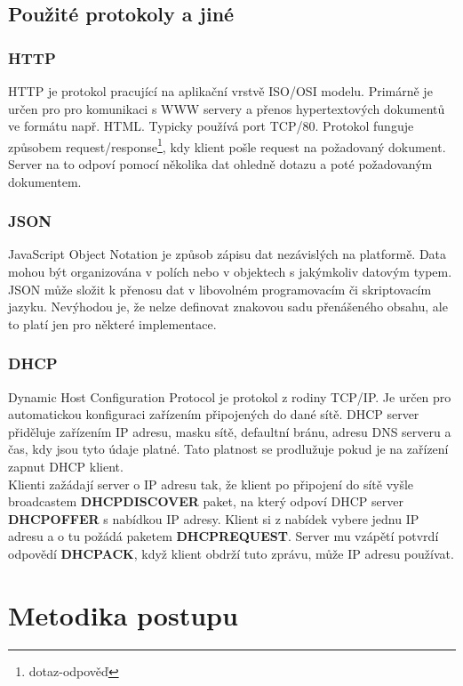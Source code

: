\documentclass[a4paper, 12pt]{report}
\begin{document}
    \section{Použité protokoly a jiné}

    \subsection{HTTP}
    HTTP je protokol pracující na aplikační vrstvě ISO/OSI modelu. Primárně je určen pro pro komunikaci s WWW servery a přenos hypertextových dokumentů ve formátu např. HTML. Typicky používá port TCP/80. Protokol funguje způsobem request/response\footnote{dotaz-odpověď}, kdy klient pošle request na požadovaný dokument. Server na to odpoví pomocí několika dat ohledně dotazu a poté požadovaným dokumentem.

    \subsection{JSON}
    JavaScript Object Notation je způsob zápisu dat nezávislých na platformě. Data mohou být organizována v polích nebo v objektech s jakýmkoliv datovým typem. JSON může složit k přenosu dat v libovolném programovacím či skriptovacím jazyku. Nevýhodou je, že nelze definovat znakovou sadu přenášeného obsahu, ale to platí jen pro některé implementace.

    \subsection{DHCP}
    Dynamic Host Configuration Protocol je protokol z rodiny TCP/IP. Je určen pro automatickou konfiguraci zařízením připojených do dané sítě. DHCP server přiděluje zařízením IP adresu, masku sítě, defaultní bránu, adresu DNS serveru a čas, kdy jsou tyto údaje platné. Tato platnost se prodlužuje pokud je na zařízení zapnut DHCP klient.\\
    Klienti zažádají server o IP adresu tak, že klient po připojení do sítě vyšle broadcastem \textbf{DHCPDISCOVER} paket, na který odpoví DHCP server \textbf{DHCPOFFER} s nabídkou IP adresy. Klient si z nabídek vybere jednu IP adresu a o tu požádá paketem \textbf{DHCPREQUEST}. Server mu vzápětí potvrdí odpovědí \textbf{DHCPACK}, když klient obdrží tuto zprávu, může IP adresu používat.


    \chapter{Metodika postupu}
\end{document}
